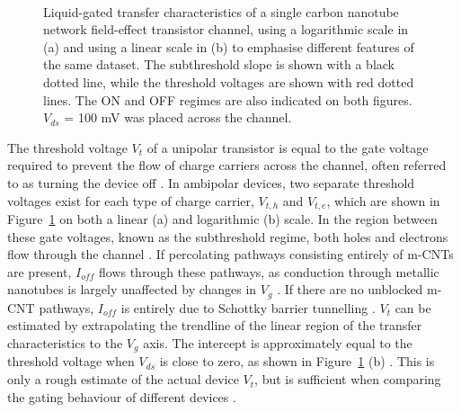 \documentclass[
  a4paper,
]{scrbook}
\begin{document}
\begin{figure}
\begin{minipage}[t]{0.45\linewidth}
{{}

}

\end{minipage}%
%
\begin{minipage}[t]{0.01\linewidth}

{\centering 

~

}

\end{minipage}%

\caption{\label{fig-CNT-characteristics}Liquid-gated transfer
characteristics of a single carbon nanotube network field-effect
transistor channel, using a logarithmic scale in (a) and using a linear
scale in (b) to emphasise different features of the same dataset. The
subthreshold slope is shown with a black dotted line, while the
threshold voltages are shown with red dotted lines. The ON and OFF
regimes are also indicated on both figures. \(V_{ds}\) = 100 mV was
placed across the channel.}

\end{figure}

The threshold voltage \(V_t\) of a unipolar transistor is equal to the
gate voltage required to prevent the flow of charge carriers across the
channel, often referred to as turning the device off
\autocite{Petti2016,Shkodra2021}. In ambipolar devices, two separate
threshold voltages exist for each type of charge carrier, \(V_{t,h}\)
and \(V_{t,e}\), which are shown in Figure~\ref{fig-CNT-characteristics}
on both a linear (a) and logarithmic (b) scale. In the region between
these gate voltages, known as the subthreshold regime, both holes and
electrons flow through the channel
\autocite{Avouris2007,Reiner-Rozman2015}. If percolating pathways
consisting entirely of m-CNTs are present, \(I_{off}\) flows through
these pathways, as conduction through metallic nanotubes is largely
unaffected by changes in \(V_g\) \autocite{Fuhrer2000,Topinka2009}. If
there are no unblocked m-CNT pathways, \(I_{off}\) is entirely due to
Schottky barrier tunnelling \autocite{Avouris2007}. \(V_t\) can be
estimated by extrapolating the trendline of the linear region of the
transfer characteristics to the \(V_g\) axis. The intercept is
approximately equal to the threshold voltage when \(V_{ds}\) is close to
zero, as shown in Figure~\ref{fig-CNT-characteristics} (b)
\autocite{Sze2006,Petti2016,Li2023}. This is only a rough estimate of
the actual device \(V_t\), but is sufficient when comparing the gating
behaviour of different devices \autocite{Li2023}.
\end{document}
